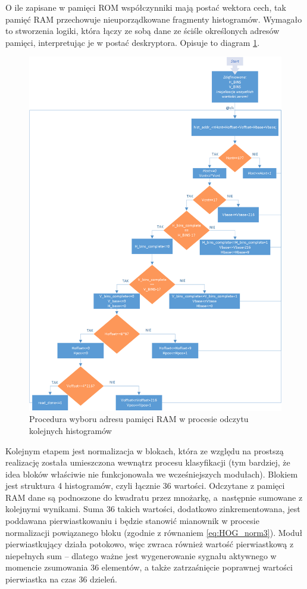 O ile zapisane w pamięci ROM współczynniki mają postać wektora cech, tak pamięć RAM przechowuje nieuporządkowane fragmenty histogramów. 
Wymagało to stworzenia logiki, która łączy ze sobą dane ze ściśle określonych adresów pamięci, interpretując je w postać deskryptora.  
Opisuje to diagram \ref{fig:hog_feature_histrogram_address}.

\begin{figure}[h!]
	\centering
	\captionsetup{justification=centering,margin=1cm}
	\includegraphics[width=15cm]{4_HOG_Features.png}
	\caption{Procedura wyboru adresu pamięci RAM w procesie odczytu kolejnych histogramów}
	\label{fig:hog_feature_histrogram_address}
\end{figure} 

Kolejnym etapem jest normalizacja w blokach, która ze względu na prostszą realizację została umieszczona wewnątrz procesu klasyfikacji (tym bardziej, że idea bloków właściwie nie funkcjonowała we wcześniejszych modułach). 
Blokiem jest struktura 4 histogramów, czyli łącznie 36 wartości. 
Odczytane z pamięci RAM dane są podnoszone do kwadratu przez mnożarkę, a~następnie sumowane z kolejnymi wynikami. 
Suma 36 takich wartości, dodatkowo zinkrementowana, jest poddawana pierwiastkowaniu i będzie stanowić mianownik w procesie normalizacji powiązanego bloku (zgodnie z równaniem \eqref{eq:HOG_norm3}). 
Moduł pierwiastkujący działa potokowo, więc zwraca również wartość pierwiastkową z niepełnych sum -- dlatego ważne jest wygenerowanie sygnału aktywnego w momencie zsumowania 36 elementów, a także zatrzaśnięcie poprawnej wartości pierwiastka na czas 36 dzieleń.


